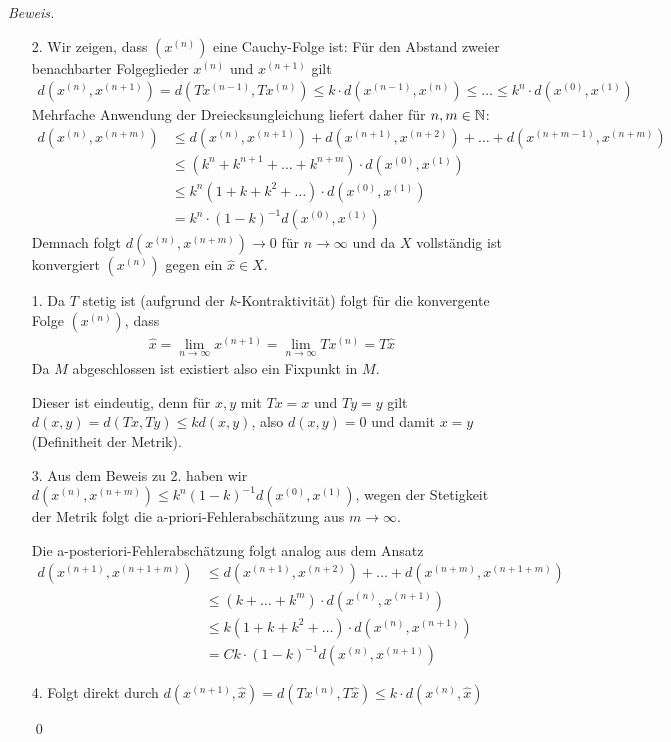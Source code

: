 \textit{Beweis.} 
\begin{enumerate}
  \item[2.] 
  Wir zeigen, dass $(x^{(n)})$ eine Cauchy-Folge ist: Für den Abstand zweier benachbarter Folgeglieder $x^{(n)}$ 
  und $x^{(n+1)}$ gilt
  \begin{align*}
    d(x^{(n)},x^{(n+1)}) 
    = d(Tx^{(n-1)},Tx^{(n)}) 
    \leq k\cdot d(x^{(n-1)},x^{(n)}) 
    \leq 
    \dotsc 
    \leq k^n\cdot d(x^{(0)},x^{(1)})
  \end{align*}
  Mehrfache Anwendung der Dreiecksungleichung liefert daher für $n,m\in\mathbb N$:
  \begin{align*}
    d(x^{(n)},x^{(n+m)}) 
    &\leq d(x^{(n)},x^{(n+1)}) + d(x^{(n+1)},x^{(n+2)}) + \dotsc + d(x^{(n+m-1)}, x^{(n+m)}) \\
    & \leq (k^n + k^{n+1} + \dotsc + k^{n+m})\cdot d(x^{(0)},x^{(1)}) \\
    & \leq k^n(1+k+k^2+\dotsc)\cdot d(x^{(0)},x^{(1)}) \\
    & = k^n\cdot(1-k)^{-1}d(x^{(0)},x^{(1)})
  \end{align*}
  Demnach folgt $d(x^{(n)},x^{(n+m)})\rightarrow 0$ für $n\rightarrow \infty$ und da $X$ vollständig ist 
  konvergiert $(x^{(n)})$ gegen ein $\hat{x}\in X$.

  \item[1.] 
  Da $T$ stetig ist (aufgrund der $k$-Kontraktivität) folgt für die konvergente Folge $(x^{(n)})$, dass 
  \begin{align*}
    \hat{x} = \lim_{n\rightarrow\infty} x^{(n+1)} = \lim_{n\rightarrow\infty} Tx^{(n)} = T\hat{x}
  \end{align*}
  Da $M$ abgeschlossen ist existiert also ein Fixpunkt in $M$. 

  Dieser ist eindeutig, denn für $x,y$ mit $Tx=x$ und $Ty=y$ gilt $d(x,y)=d(Tx,Ty)\leq k d(x,y)$, also $d(x,y)=0$ und 
  damit $x=y$ (Definitheit der Metrik).

  \item[3.] 
  Aus dem Beweis zu 2. haben wir $d(x^{(n)},x^{(n+m)})\leq k^n(1-k)^{-1}d(x^{(0)},x^{(1)})$, wegen der Stetigkeit 
  der Metrik folgt die a-priori-Fehlerabschätzung aus $m\rightarrow\infty$. 

  Die a-posteriori-Fehlerabschätzung folgt analog aus dem Ansatz
  \begin{align*}
    d(x^{(n+1)},x^{(n+1+m)}) &\leq d(x^{(n+1)},x^{(n+2)}) + \dotsc + d(x^{(n+m)}, x^{(n+1+m)}) \\
    & \leq (k + \dotsc + k^{m})\cdot d(x^{(n)},x^{(n+1)}) \\
    & \leq k(1+k+k^2+\dotsc)\cdot d(x^{(n)},x^{(n+1)}) \\
    & =C k\cdot(1-k)^{-1}d(x^{(n)},x^{(n+1)})
  \end{align*}
  \item[4.] 
  Folgt direkt durch $d(x^{(n+1)},\hat{x})=d(Tx^{(n)},T\hat{x})\leq k\cdot d(x^{(n)},\hat{x})$ 

  \qed
\end{enumerate}

